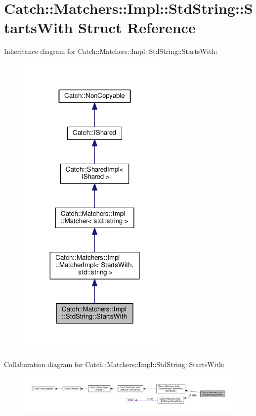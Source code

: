 \hypertarget{structCatch_1_1Matchers_1_1Impl_1_1StdString_1_1StartsWith}{}\section{Catch\+:\+:Matchers\+:\+:Impl\+:\+:Std\+String\+:\+:Starts\+With Struct Reference}
\label{structCatch_1_1Matchers_1_1Impl_1_1StdString_1_1StartsWith}


Inheritance diagram for Catch\+:\+:Matchers\+:\+:Impl\+:\+:Std\+String\+:\+:Starts\+With\+:
\nopagebreak
\begin{figure}[H]
\begin{center}
\leavevmode
\includegraphics[width=215pt]{structCatch_1_1Matchers_1_1Impl_1_1StdString_1_1StartsWith__inherit__graph}
\end{center}
\end{figure}


Collaboration diagram for Catch\+:\+:Matchers\+:\+:Impl\+:\+:Std\+String\+:\+:Starts\+With\+:
\nopagebreak
\begin{figure}[H]
\begin{center}
\leavevmode
\includegraphics[width=350pt]{structCatch_1_1Matchers_1_1Impl_1_1StdString_1_1StartsWith__coll__graph}
\end{center}
\end{figure}
